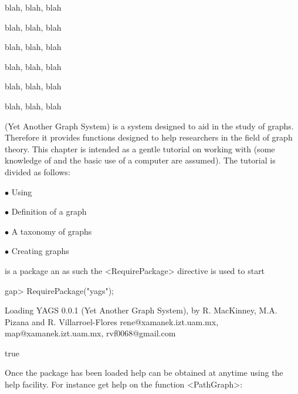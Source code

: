 

blah, blah, blah


blah, blah, blah


blah, blah, blah


blah, blah, blah


blah, blah, blah


blah, blah, blah



{\YAGS} (Yet Another Graph System) is a system designed to aid in the
study of graphs. Therefore it provides functions designed to help
researchers in the field of graph theory. This chapter is intended as a gentle 
tutorial on working with {\YAGS} (some knowledge of {\GAP} and the basic use of a
computer are assumed). The tutorial is divided as follows:
\beginlist
\item{$\bullet$} Using {\YAGS}

\item{$\bullet$} Definition of a graph

\item{$\bullet$} A taxonomy of graphs

\item{$\bullet$} Creating graphs
\endlist


{\YAGS} is a {\GAP} package an as such the <RequirePackage> directive is
used to start {\YAGS} 

\beginexample 
gap> RequirePackage("yags");

Loading  YAGS 0.0.1  (Yet Another Graph System),
by  R. MacKinney, M.A. Pizana and R. Villarroel-Flores
rene@xamanek.izt.uam.mx, map@xamanek.izt.uam.mx, rvf0068@gmail.com

true
\endexample

Once the package has been loaded help can be obtained at anytime using
the {\GAP} help facility. For instance get help on the function
<PathGraph>:

